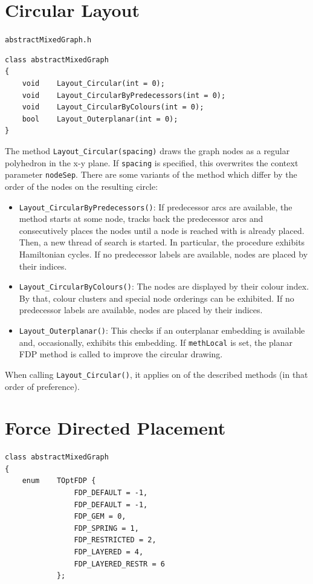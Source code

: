 \documentclass[a4paper,11pt,twoside]{book}
\begin{document}
\begin{multicols}{2}
\section{Circular Layout}
\label{slb_circular_layout}
\myinclude\verb/abstractMixedGraph.h/
\begin{mymethods}
\begin{verbatim}
class abstractMixedGraph
{
    void    Layout_Circular(int = 0);
    void    Layout_CircularByPredecessors(int = 0);
    void    Layout_CircularByColours(int = 0);
    bool    Layout_Outerplanar(int = 0);
}
\end{verbatim}
\end{mymethods}
The method \verb/Layout_Circular(spacing)/ draws the graph nodes as a regular
polyhedron in the x-y plane. If \verb/spacing/ is specified, this overwrites
the context parameter \verb/nodeSep/. There are some variants of the method
which differ by the order of the nodes on the resulting circle:
\begin{itemize}
\item \verb/Layout_CircularByPredecessors()/: If predecessor arcs are
    available, the method starts at some node, tracks back the predecessor arcs
    and consecutively places the nodes until a node is reached with is already
    placed. Then, a new thread of search is started. In particular, the procedure
    exhibits Hamiltonian cycles. If no predecessor labels are available, nodes
    are placed by their indices.
\item \verb/Layout_CircularByColours()/: The nodes are displayed by their colour
    index. By that, colour clusters and special node orderings can be exhibited.
    If no predecessor labels are available, nodes are placed by their indices.
\item \verb/Layout_Outerplanar()/: This checks if an outerplanar embedding
    is available and, occasionally, exhibits this embedding. If \verb/methLocal/
    is set, the planar FDP method is called to improve the circular drawing.
\end{itemize}
When calling \verb/Layout_Circular()/, it applies on of the described methods
(in that order of preference).


\section{Force Directed Placement}
\label{slb_force_directed}
\begin{mymethods}
\begin{verbatim}
class abstractMixedGraph
{
    enum    TOptFDP {
                FDP_DEFAULT = -1,
                FDP_DEFAULT = -1,
                FDP_GEM = 0,
                FDP_SPRING = 1,
                FDP_RESTRICTED = 2,
                FDP_LAYERED = 4,
                FDP_LAYERED_RESTR = 6
            };


\end{verbatim}
\end{mymethods}
\end{multicols}
\end{document}
